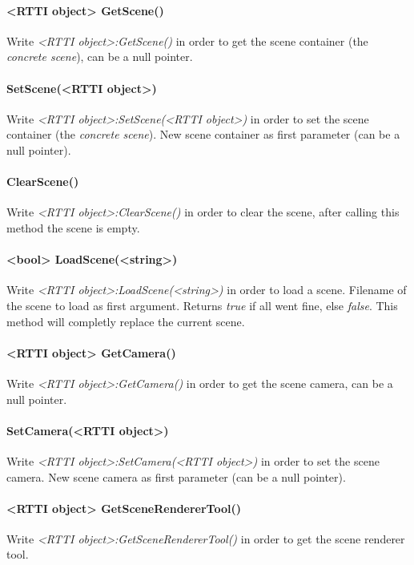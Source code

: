 \paragraph{<RTTI object> GetScene()}
Write \emph{<RTTI object>:GetScene()} in order to get the scene container (the \emph{concrete scene}), can be a null pointer.

\paragraph{SetScene(<RTTI object>)}
Write \emph{<RTTI object>:SetScene(<RTTI object>)} in order to set the scene container (the \emph{concrete scene}). New scene container as first parameter (can be a null pointer).

\paragraph{ClearScene()}
Write \emph{<RTTI object>:ClearScene()} in order to clear the scene, after calling this method the scene is empty.

\paragraph{<bool> LoadScene(<string>)}
Write \emph{<RTTI object>:LoadScene(<string>)} in order to load a scene. Filename of the scene to load as first argument. Returns \emph{true} if all went fine, else \emph{false}. This method will completly replace the current scene.

\paragraph{<RTTI object> GetCamera()}
Write \emph{<RTTI object>:GetCamera()} in order to get the scene camera, can be a null pointer.

\paragraph{SetCamera(<RTTI object>)}
Write \emph{<RTTI object>:SetCamera(<RTTI object>)} in order to set the scene camera. New scene camera as first parameter (can be a null pointer).

\paragraph{<RTTI object> GetSceneRendererTool()}
Write \emph{<RTTI object>:GetSceneRendererTool()} in order to get the scene renderer tool.

